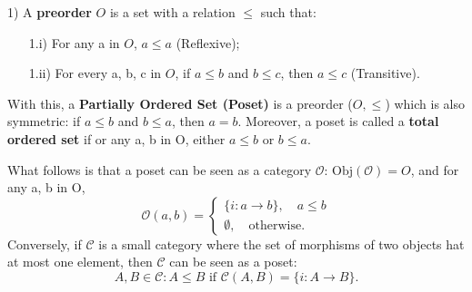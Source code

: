 \documentclass[../category_theory.tex]{subfiles}
\begin{document}
\begin{example}
	\item[1)] A \textbf{preorder} \(O\) is a set with a relation \(\leq \) such that:
	\begin{itemize}
		\item[1.i)] For any a in \(O\), \(a\leq a\) (Reflexive);
		\item[1.ii)] For every a, b, c in \(O\), if \(a\leq b\) and \(b\leq c\), then \(a\leq c\) (Transitive).
	\end{itemize}
	With this, a \textbf{Partially Ordered Set (Poset)} is a preorder (\(O, \leq \)) which is also symmetric: if \(a\leq b\) and \(b\leq a\), then \(a = b\). Moreover, a poset is called a \textbf{total ordered set} if or any a, b in O, either \(a\leq b\) or \(b\leq a\).

	What follows is that a poset can be seen as a category \(\mathcal{O}\): \(\mathrm{Obj}(\mathcal{O}) = O\), and for any a, b in O,
	\[
		\mathcal{O}(a, b)  = \left\{\begin{array}{ll}
			\{i:a\rightarrow b\},\quad a\leq b \\
			\emptyset,\quad \text{otherwise}.
		\end{array}\right.
	\]
	Conversely, if \(\mathcal{C}\) is a small category where the set of morphisms of two objects hat at most one element, then \(\mathcal{C}\) can be seen as a poset:
	\[
		A, B\in \mathcal{C}: A\leq B \text{ if } \mathcal{C}(A, B)=\{i:A\rightarrow B\}.
	\]


\end{example}
\end{document}
